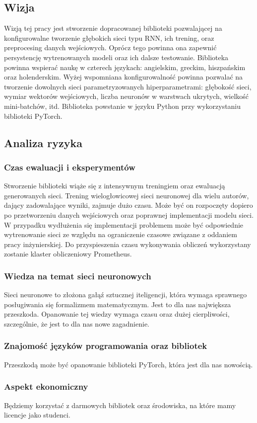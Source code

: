 \subsection{Wizja}
Wizją tej pracy jest stworzenie dopracowanej biblioteki pozwalającej na konfigurowalne tworzenie 
głębokich sieci typu RNN, ich trening, oraz preprocesing danych wejściowych. Oprócz tego powinna ona 
zapewnić persystencję wytrenowanych modeli oraz ich dalsze testowanie. Biblioteka powinna wspierać 
naukę w czterech językach: angielskim, greckim, hiszpańskim oraz holenderskim. Wyżej wspomniana konfigurowalność powinna 
pozwalać na tworzenie dowolnych sieci parametryzowanych hiperparametrami: głębokość sieci, wymiar 
wektorów wejściowych, liczba neuronów w warstwach ukrytych, wielkość mini-batchów, itd.
Biblioteka powstanie w języku Python przy wykorzystaniu biblioteki PyTorch.

\subsection{Analiza ryzyka}

\subsubsection{Czas ewaluacji i eksperymentów}
Stworzenie biblioteki wiąże się z intensywnym treningiem oraz ewaluacją
generowanych sieci. Trening wielogłowicowej sieci neuronowej dla wielu autorów, dający zadowalające 
wyniki, zajmuje dużo czasu. Może być on rozpoczęty dopiero po przetworzeniu danych wejściowych
oraz poprawnej implementacji modelu sieci. W przypadku wydłużenia się implementacji problemem może być
odpowiednie wytrenowanie sieci ze względu na ograniczenie czasowe związane z oddaniem pracy inżynierskiej.
Do przyspieszenia czasu wykonywania obliczeń wykorzystany zostanie klaster obliczeniowy Prometheus.

\subsubsection{Wiedza na temat sieci neuronowych}
Sieci neuronowe to złożona gałąź sztucznej iteligencji, która wymaga sprawnego posługiwania się formalizmem matematycznym.
Jest to dla nas największa przeszkoda. Opanowanie tej wiedzy wymaga czasu oraz dużej cierpliwości, 
szczególnie, że jest to dla nas nowe zagadnienie.

\subsubsection{Znajomość języków programowania oraz bibliotek }
Przeszkodą może być opanowanie biblioteki PyTorch, która jest dla nas nowością.

\subsubsection{Aspekt ekonomiczny }
Będziemy korzystać z darmowych bibliotek oraz środowiska, na które mamy licencje jako studenci.